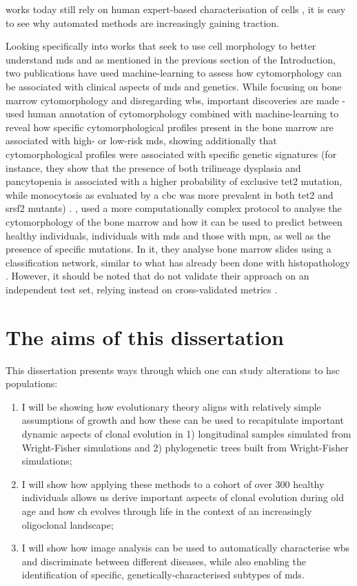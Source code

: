 works today still rely on human expert-based characterisation of cells \cite{Nagata2020-lh}, it is easy to see why automated methods are increasingly gaining traction.

Looking specifically into works that seek to use cell morphology to better understand \ac{mds} and as mentioned in the previous section of the Introduction, two publications have used machine-learning to assess how cytomorphology can be associated with clinical aspects of \ac{mds} and genetics. While focusing on bone marrow cytomorphology and disregarding \ac{wbs}, important discoveries are made -  used human annotation of cytomorphology combined with machine-learning to reveal how specific cytomorphological profiles present in the bone marrow are associated with high- or low-risk \ac{mds}, showing additionally that cytomorphological profiles were associated with specific genetic signatures (for instance, they show that the presence of both trilineage dysplasia and pancytopenia is associated with a higher probability of exclusive \ac{tet2} mutation, while monocytosis as evaluated by a \ac{cbc} was more prevalent in both \ac{tet2} and \ac{srsf2} mutants) \cite{Nagata2020-lh}. , used a more computationally complex protocol to analyse the cytomorphology of the bone marrow and how it can be used to predict between healthy individuals, individuals with \ac{mds} and those with \ac{mpn}, as well as the presence of specific mutations. In it, they analyse bone marrow slides using a classification network, similar to what has already been done with histopathology \cite{Fu2020-mx}. However, it should be noted that  do not validate their approach on an independent test set, relying instead on cross-validated metrics \cite{Bruck2021-fx}. 

\section{The aims of this dissertation}

This dissertation presents ways through which one can study alterations to \ac{hsc} populations:

\begin{enumerate}
	\item I will be showing how evolutionary theory aligns with relatively simple assumptions of growth and how these can be used to recapitulate important dynamic aspects of clonal evolution in 1) longitudinal samples simulated from Wright-Fisher simulations and 2) phylogenetic trees built from Wright-Fisher simulations;
	\item I will show how applying these methods to a cohort of over 300 healthy individuals allows us derive important aspects of clonal evolution during old age and how \ac{ch} evolves through life in the context of an increasingly oligoclonal landscape;
	\item I will show how image analysis can be used to automatically characterise \ac{wbs} and discriminate between different diseases, while also enabling the identification of specific, genetically-characterised subtypes of \ac{mds}.
\end{enumerate}